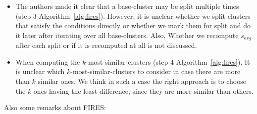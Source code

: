 \begin{itemize}
	\item The authors made it clear that a base-cluster may be split multiple times (step 3 Algorithm~\ref{alg:fires}). However, it is unclear whether we split clusters that satisfy the conditions directly or whether we mark them for split and do it later after iterating over all base-clusters. Also, Whether we recompute $s_{avg}$ after each split or if it is recomputed at all is not discussed.
	\item When computing the $k$-most-similar-clusters (step 4 Algorithm~\ref{alg:fires}). It is unclear which $k$-most-similar-clusters to consider in case there are more than $k$ similar ones. We think in such a case the right approach is to choose the $k$ ones having the least difference, since they are more similar than others.  
\end{itemize}
Also some remarks about FIRES:
